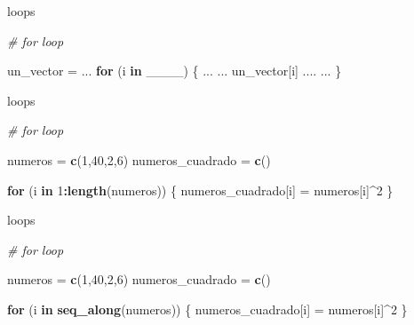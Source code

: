 \documentclass[ignorenonframetext,]{beamer}
\newenvironment{Shaded}{\begin{snugshade}}{\end{snugshade}}
\newcommand{\CommentTok}[1]{\textcolor[rgb]{0.56,0.35,0.01}{\textit{#1}}}
\newcommand{\ControlFlowTok}[1]{\textcolor[rgb]{0.13,0.29,0.53}{\textbf{#1}}}
\newcommand{\DecValTok}[1]{\textcolor[rgb]{0.00,0.00,0.81}{#1}}
\newcommand{\KeywordTok}[1]{\textcolor[rgb]{0.13,0.29,0.53}{\textbf{#1}}}
\newcommand{\NormalTok}[1]{#1}
\newcommand{\OperatorTok}[1]{\textcolor[rgb]{0.81,0.36,0.00}{\textbf{#1}}}
\newcommand{\StringTok}[1]{\textcolor[rgb]{0.31,0.60,0.02}{#1}}
\begin{document}
\begin{frame}[fragile]{loops}
\protect\hypertarget{loops}{}

\begin{Shaded}
\begin{Highlighting}[]
\CommentTok{# for loop}

\NormalTok{un_vector =}\StringTok{ }\NormalTok{...}
\ControlFlowTok{for}\NormalTok{ (i }\ControlFlowTok{in}\NormalTok{ ____) \{}
\NormalTok{  ...}
\NormalTok{  ... un_vector[i] ....}
\NormalTok{  ...}
\NormalTok{\}}
\end{Highlighting}
\end{Shaded}

\end{frame}

\begin{frame}[fragile]{loops}
\protect\hypertarget{loops-1}{}

\begin{Shaded}
\begin{Highlighting}[]
\CommentTok{# for loop}

\NormalTok{numeros =}\StringTok{ }\KeywordTok{c}\NormalTok{(}\DecValTok{1}\NormalTok{,}\DecValTok{40}\NormalTok{,}\DecValTok{2}\NormalTok{,}\DecValTok{6}\NormalTok{)}
\NormalTok{numeros_cuadrado =}\StringTok{ }\KeywordTok{c}\NormalTok{()}

\ControlFlowTok{for}\NormalTok{ (i }\ControlFlowTok{in} \DecValTok{1}\OperatorTok{:}\KeywordTok{length}\NormalTok{(numeros)) \{}
\NormalTok{  numeros_cuadrado[i] =}\StringTok{ }\NormalTok{numeros[i]}\OperatorTok{^}\DecValTok{2}
\NormalTok{\}}
\end{Highlighting}
\end{Shaded}

\end{frame}

\begin{frame}[fragile]{loops}
\protect\hypertarget{loops-2}{}

\begin{Shaded}
\begin{Highlighting}[]
\CommentTok{# for loop}

\NormalTok{numeros =}\StringTok{ }\KeywordTok{c}\NormalTok{(}\DecValTok{1}\NormalTok{,}\DecValTok{40}\NormalTok{,}\DecValTok{2}\NormalTok{,}\DecValTok{6}\NormalTok{)}
\NormalTok{numeros_cuadrado =}\StringTok{ }\KeywordTok{c}\NormalTok{()}

\ControlFlowTok{for}\NormalTok{ (i }\ControlFlowTok{in} \KeywordTok{seq_along}\NormalTok{(numeros)) \{}
\NormalTok{  numeros_cuadrado[i] =}\StringTok{ }\NormalTok{numeros[i]}\OperatorTok{^}\DecValTok{2}
\NormalTok{\}}
\end{Highlighting}
\end{Shaded}

\end{frame}
\end{document}
